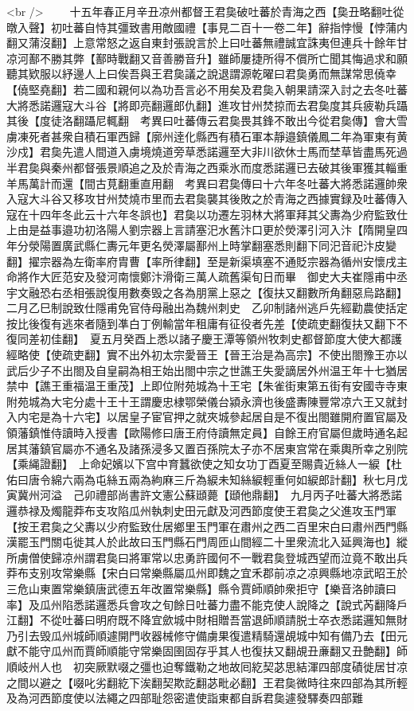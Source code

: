 <br />
　　十五年春正月辛丑凉州都督王君㚟破吐蕃於青海之西【㚟丑略翻吐從暾入聲】初吐蕃自恃其彊致書用敵國禮【事見二百十一卷二年】辭指悖慢【悖蒲内翻又蒲沒翻】上意常怒之返自東封張說言於上曰吐蕃無禮誠宜誅夷但連兵十餘年甘凉河鄯不勝其弊【鄯時戰翻又音善勝音升】雖師屢捷所得不償所亡聞其悔過求和願聽其欵服以紓邊人上曰俟吾與王君㚟議之說退謂源乾曜曰君㚟勇而無謀常思僥幸【僥堅堯翻】若二國和親何以為功吾言必不用矣及君㚟入朝果請深入討之去冬吐蕃大將悉諾邏寇大斗谷【將即亮翻邏郎仇翻】進攻甘州焚掠而去君㚟度其兵疲勒兵躡其後【度徒洛翻躡尼輒翻　考異曰吐蕃傳云君㚟畏其鋒不敢出今從君㚟傳】會大雪虜凍死者甚衆自積石軍西歸【廓州逹化縣西有積石軍本靜邉鎮儀鳳二年為軍東有黄沙戍】君㚟先遣人間道入虜境燒道旁草悉諾邏至大非川欲休士馬而埜草皆盡馬死過半君㚟與秦州都督張景順追之及於青海之西乘氷而度悉諾邏已去破其後軍獲其輜重羊馬萬計而還【間古莧翻重直用翻　考異曰君㚟傳曰十六年冬吐蕃大將悉諾邏帥衆入寇大斗谷又移攻甘州焚燒市里而去君㚟襲其後敗之於青海之西據實録及吐蕃傳入寇在十四年冬此云十六年冬誤也】君㚟以功遷左羽林大將軍拜其父夀為少府監致仕上由是益事邉功初洛陽人劉宗器上言請塞汜水舊汴口更於熒澤引河入汴【隋開皇四年分滎陽置廣武縣仁夀元年更名熒澤屬鄯州上時掌翻塞悉則翻下同汜音祀汴皮變翻】擢宗器為左衛率府胄曹【率所律翻】至是新渠填塞不通貶宗器為循州安懷戌主命將作大匠范安及發河南懷鄭汴滑衛三萬人疏舊渠旬日而畢　御史大夫崔隱甫中丞宇文融恐右丞相張說復用數奏毁之各為朋黨上惡之【復扶又翻數所角翻惡烏路翻】二月乙巳制說致仕隱甫免官侍母融出為魏州刺史　乙卯制諸州逃戶先經勸農使括定按比後復有逃來者隨到凖白丁例輸當年租庸有征役者先差【使疏吏翻復扶又翻下不復同差初佳翻】　夏五月癸酉上悉以諸子慶王潭等領州牧刺史都督節度大使大都護經略使【使疏吏翻】實不出外初太宗愛晉王【晉王治是為高宗】不使出閤豫王亦以武后少子不出閤及自皇嗣為相王始出閤中宗之世譙王失愛謫居外州温王年十七猶居禁中【譙王重福温王重茂】上即位附苑城為十王宅【朱雀街東第五街有安國寺寺東附苑城為大宅分處十王十王謂慶忠棣鄂榮儀台潁永濟也後盛夀陳豐常凉六王又就封入内宅是為十六宅】以居皇子宦官押之就夾城參起居自是不復出閤雖開府置官屬及領藩鎮惟侍讀時入授書【歐陽修曰唐王府侍讀無定員】自餘王府官屬但歲時通名起居其藩鎮官屬亦不通名及諸孫浸多又置百孫院太子亦不居東宫常在乘輿所幸之别院【乘䋲證翻】　上命妃嬪以下宫中育蠶欲使之知女功丁酉夏至賜貴近絲人一綟【杜佑曰唐令綿六兩為屯絲五兩為絇麻三斤為綟未知絲綟輕重何如綟郎計翻】秋七月戊寅冀州河溢　己卯禮部尚書許文憲公蘇頲薨【頲他鼎翻】　九月丙子吐蕃大將悉諾邏恭禄及燭龍莽布支攻陷瓜州執刺史田元獻及河西節度使王君㚟之父進攻玉門軍【按王君㚟之父夀以少府監致仕居鄉里玉門軍在肅州之西二百里宋白曰肅州西門縣漢罷玉門關屯徙其人於此故曰玉門縣石門周匝山間經二十里衆流北入延興海也】縱所虜僧使歸凉州謂君㚟曰將軍常以忠勇許國何不一戰君㚟登城西望而泣竟不敢出兵莽布支别攻常樂縣【宋白曰常樂縣屬瓜州即魏之宜禾郡前凉之凉興縣地凉武昭王於三危山東置常樂鎮唐武德五年改置常樂縣】縣令賈師順帥衆拒守【樂音洛帥讀曰率】及瓜州陷悉諾邏悉兵會攻之旬餘日吐蕃力盡不能克使人說降之【說式芮翻降戶江翻】不從吐蕃曰明府既不降宜歛城中財相贈吾當退師順請脱士卒衣悉諾邏知無財乃引去毁瓜州城師順遽開門收器械修守備虜果復遣精騎還覘城中知有備乃去【田元獻不能守瓜州而賈師順能守常樂固圉固存乎其人也復扶又翻覘丑亷翻又丑艶翻】師順岐州人也　初突厥默啜之彊也迫奪鐵勒之地故囘紇契苾思結渾四部度磧徙居甘凉之間以避之【啜叱劣翻紇下涘翻契欺訖翻苾毗必翻】王君㚟微時往來四部為其所輕及為河西節度使以法繩之四部耻怨密遣使詣東都自訴君㚟遽發驛奏四部難